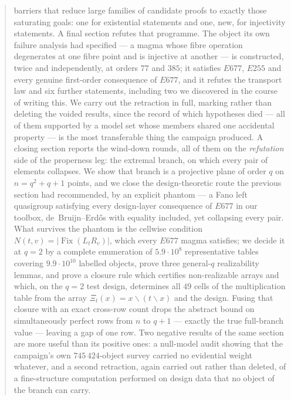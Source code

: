 \documentclass[11pt]{article}
\theoremstyle{plain}
\theoremstyle{definition}
\theoremstyle{remark}
\numberwithin{equation}{section}
\newcommand{\Fix}{\operatorname{Fix}}
\begin{document}
\begin{abstract}
barriers that reduce large families of candidate proofs to exactly those saturating
goals: one for existential statements and one, new, for injectivity statements.
A final section refutes that programme. The object its own failure analysis had specified
--- a magma whose fibre operation degenerates at one fibre point and is injective at
another --- is constructed, twice and independently, at orders $77$ and $385$; it satisfies
$E677$, $E255$ and every genuine first-order consequence of $E677$, and it refutes the
transport law and six further statements, including two we discovered in the course of
writing this. We carry out the retraction in full, marking rather than deleting the voided
results, since the record of which hypotheses died --- all of them supported by a model set
whose members shared one accidental property --- is the most transferable thing the campaign
produced.
A closing section reports the wind-down rounds, all of them on the \emph{refutation} side of
the properness leg: the extremal branch, on which every pair of elements collapses. We show
that branch is a projective plane of order $q$ on $n = q^2+q+1$ points, and we close the
design-theoretic route the previous section had recommended, by an explicit phantom --- a
Fano left quasigroup satisfying every design-layer consequence of $E677$ in our toolbox,
de~Bruijn--Erd\H{o}s with equality included, yet collapsing every pair. What survives the
phantom is the cellwise condition $N(t,v) = |\Fix(L_tR_v)|$, which every $E677$ magma
satisfies; we decide it at $q=2$ by a complete enumeration of $5.9\cdot10^{8}$ representative
tables covering $9.9\cdot10^{10}$ labelled objects, prove three general-$q$ realizability
lemmas, and prove a closure rule which certifies non-realizable arrays and which,
on the $q = 2$ test design, determines all $49$ cells of the multiplication table
from the array $\Xi_t(x) = x\backslash(t\backslash x)$ and the design. Fusing that closure with an exact cross-row count drops the
abstract bound on simultaneously perfect rows from $n$ to $q+1$ --- exactly the true
full-branch value --- leaving a gap of one row. Two negative results of the same section are
more useful than its positive ones: a null-model audit showing that the campaign's own
$745\,424$-object survey carried no evidential weight whatever, and a second retraction,
again carried out rather than deleted, of a fine-structure computation performed on design
data that no object of the branch can carry.
\end{abstract}

\tableofcontents
\end{document}
